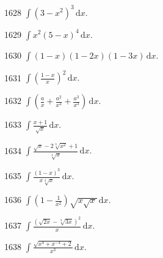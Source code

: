 


\begin{prob}[S]{1628}
$\displaystyle\int (3 - x^2)^3 \,\mathrm{d}x.$
\end{prob}

\begin{prob}[S]{1629}
$\displaystyle\int x^2 (5 - x)^4 \,\mathrm{d}x.$
\end{prob}

\begin{prob}[S]{1630}
$\displaystyle\int (1 - x)(1 - 2x)(1 - 3x) \,\mathrm{d}x.$
\end{prob}

\begin{prob}[S]{1631}
$\displaystyle\int \left(\frac{1 - x}{x}\right)^2 \,\mathrm{d}x.$
\end{prob}

\begin{prob}[S]{1632}
$\displaystyle\int \left(\frac{a}{x} + \frac{a^2}{x^2} + \frac{a^3}{x^3}\right) \,\mathrm{d}x.$
\end{prob}

\begin{prob}[S]{1633}
$\displaystyle\int \frac{x + 1}{\sqrt{x}} \,\mathrm{d}x.$
\end{prob}

\begin{prob}[S]{1634}
$\displaystyle\int \frac{\sqrt{x} - 2\sqrt[3]{x^2} + 1}{\sqrt[4]{x}} \,\mathrm{d}x.$
\end{prob}

\begin{prob}[S]{1635}
$\displaystyle\int \frac{(1 - x)^3}{x\sqrt[3]{x}} \,\mathrm{d}x.$
\end{prob}

\begin{prob}[S]{1636}
$\displaystyle\int \left(1 - \frac{1}{x^2}\right)\sqrt{x\sqrt{x}} \,\mathrm{d}x.$
\end{prob}

\begin{prob}[S]{1637}
$\displaystyle\int \frac{(\sqrt{2x} - \sqrt[3]{3x})^2}{x} \,\mathrm{d}x.$
\end{prob}

\begin{prob}[S]{1638}
$\displaystyle\int \frac{\sqrt{x^4 + x^{-4} + 2}}{x^3} \,\mathrm{d}x.$
\end{prob}

